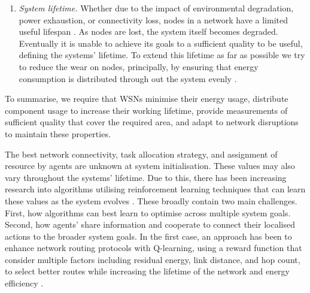 \begin{enumerate}
\item \label{requirement:lifetime} \textit{System lifetime.} Whether due to the impact of environmental degradation, power exhaustion, or connectivity loss, nodes in a network have a limited useful lifespan \citep{Mak2009}. As nodes are lost, the system itself becomes degraded. Eventually it is unable to achieve its goals to a sufficient quality to be useful, defining the systems' lifetime. To extend this lifetime as far as possible we try to reduce the wear on nodes, principally, by ensuring that energy consumption is distributed through out the system evenly \citep{BABAYO20171176, Engmann2018}.
\end{enumerate}
To summarise, we require that WSNs minimise their energy usage, distribute component usage to increase their working lifetime, provide measurements of sufficient quality that cover the required area, and adapt to network disruptions to maintain these properties.

The best network connectivity, task allocation strategy, and assignment of resource by agents are unknown at system initialisation. These values may also vary throughout the systems' lifetime. Due to this, there has been increasing research into algorithms utilising reinforcement learning techniques that can learn these values as the system evolves \citep{Al-Rawi2015}. These broadly contain two main challenges. First, how algorithms can best learn to optimise across multiple system goals. Second, how agents' share information and cooperate to connect their localised actions to the broader system goals. In the first case, an approach has been to enhance network routing protocols with Q-learning, using a reward function that consider multiple factors including residual energy, link distance, and hop count, to select better routes while increasing the lifetime of the network and energy efficiency \citep{Guo2019}. 


